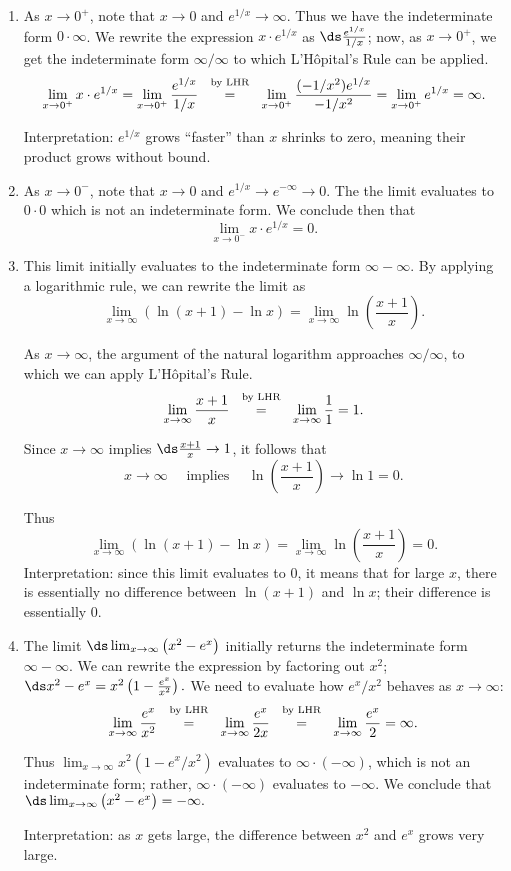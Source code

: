 {\begin{enumerate}
	\item	As $x\to 0^+$, note that $x\to 0$ and $e^{1/x}\to \infty$. Thus we have the indeterminate form $0\cdot\infty$. We rewrite the expression $x\cdot e^{1/x}$ as $\ds\frac{e^{1/x}}{1/x}$; now, as $x\to 0^+$, we get the indeterminate form $\infty/\infty$ to which L'H\^opital's Rule can be applied. 
\[
\lim_{x\to0^+} x\cdot e^{1/x} = \lim_{x\to 0^+} \frac{e^{1/x}}{1/x} \stackrel{\ \text{ by LHR \rule[-5pt]{0pt}{3pt}} \ }{=} \lim_{x\to 0^+}\frac{(-1/x^2)e^{1/x}}{-1/x^2} =\lim_{x\to 0^+}e^{1/x} =\infty.
\]

Interpretation: $e^{1/x}$ grows ``faster'' than $x$ shrinks to zero, meaning their product grows without bound.

	\item	As $x\to 0^-$, note that $x\to 0$ and $e^{1/x}\to e^{-\infty}\to 0$. The the limit evaluates to $0\cdot 0$ which is not an indeterminate form. We conclude then that $$\lim_{x\to 0^-}x\cdot e^{1/x} = 0.$$

	\item	This limit initially evaluates to the indeterminate form $\infty-\infty$. By applying a logarithmic rule, we can rewrite the limit as 
\[
\lim_{x\to\infty}\left(\ln(x+1)-\ln x\right) = \lim_{x\to \infty} \ln \left(\frac{x+1}x\right).
\]

As $x\to \infty$, the argument of the natural logarithm approaches $\infty/\infty$, to which we can apply L'H\^opital's Rule.
\[\lim_{x\to\infty} \frac{x+1}x \stackrel{\ \text{ by LHR \rule[-5pt]{0pt}{3pt}} \ }{=} \lim_{x\to\infty}\frac11=1.
\]

Since $x\to\infty$ implies $\ds\frac{x+1}x\to 1$, it follows that 
\[x\to\infty \quad \text{ implies }\quad \ln\left(\frac{x+1}x\right)\to\ln 1=0.\]

Thus
\[
 \lim_{x\to\infty} \left(\ln(x+1)-\ln x\right)
 = \lim_{x\to \infty} \ln \left(\frac{x+1}x\right)=0.
\]
Interpretation: since this limit evaluates to 0, it means that for large $x$, there is essentially no difference between $\ln (x+1)$ and $\ln x$; their difference is essentially 0.

	\item	The limit $\ds \lim_{x\to\infty} \left(x^2-e^x\right)$ initially returns the indeterminate form $\infty-\infty$. We can rewrite the expression by factoring out $x^2$; $\ds x^2-e^x = x^2\left(1-\frac{e^x}{x^2}\right).$ We need to evaluate how $e^x/x^2$ behaves as $x\to\infty$:
$$\lim_{x\to\infty}\frac{e^x}{x^2} \stackrel{\ \text{ by LHR \rule[-5pt]{0pt}{3pt}} \ }{=} \lim_{x\to\infty} \frac{e^x}{2x} \stackrel{\ \text{ by LHR \rule[-5pt]{0pt}{3pt}} \ }{=} \lim_{x\to\infty} \frac{e^x}{2} = \infty.$$

Thus $\lim_{x\to\infty}x^2(1-e^x/x^2)$ evaluates to $\infty\cdot(-\infty)$, which is not an indeterminate form; rather, $\infty\cdot(-\infty)$ evaluates to $-\infty$. We conclude that 
$\ds \lim_{x\to\infty} \left(x^2-e^x\right) = -\infty.$

Interpretation: as $x$ gets large, the difference between $x^2$ and $e^x$ grows very large.\eoehere
\end{enumerate}}

